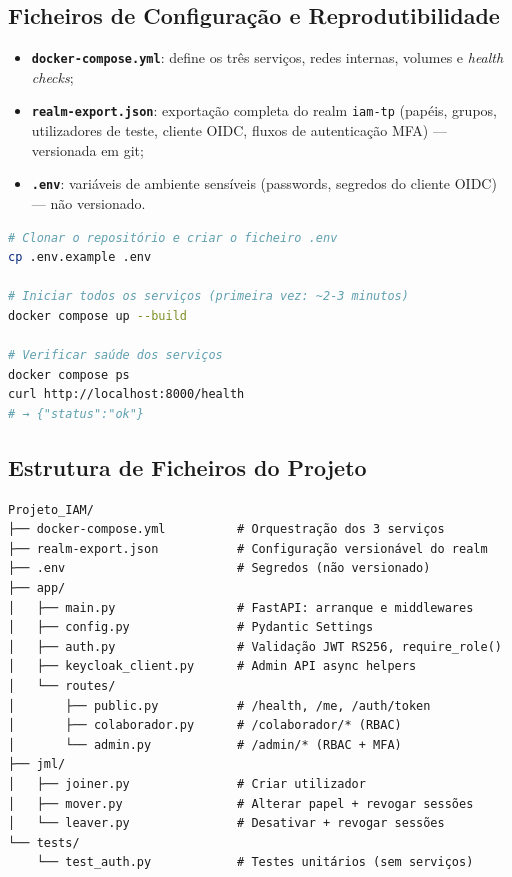 \documentclass[12pt,a4paper]{article}
\begin{document}
\subsection{Ficheiros de Configuração e Reprodutibilidade}

\begin{itemize}[leftmargin=1.5cm]
  \item \textbf{\texttt{docker-compose.yml}}: define os três serviços, redes internas, volumes e \textit{health checks};
  \item \textbf{\texttt{realm-export.json}}: exportação completa do realm \texttt{iam-tp} (papéis, grupos, utilizadores de teste, cliente OIDC, fluxos de autenticação MFA) — versionada em git;
  \item \textbf{\texttt{.env}}: variáveis de ambiente sensíveis (passwords, segredos do cliente OIDC) — não versionado.
\end{itemize}

\begin{lstlisting}[language=bash, caption=Arranque completo da infraestrutura]
# Clonar o repositório e criar o ficheiro .env
cp .env.example .env

# Iniciar todos os serviços (primeira vez: ~2-3 minutos)
docker compose up --build

# Verificar saúde dos serviços
docker compose ps
curl http://localhost:8000/health
# → {"status":"ok"}
\end{lstlisting}

\subsection{Estrutura de Ficheiros do Projeto}

\begin{verbatim}
Projeto_IAM/
├── docker-compose.yml          # Orquestração dos 3 serviços
├── realm-export.json           # Configuração versionável do realm
├── .env                        # Segredos (não versionado)
├── app/
│   ├── main.py                 # FastAPI: arranque e middlewares
│   ├── config.py               # Pydantic Settings
│   ├── auth.py                 # Validação JWT RS256, require_role()
│   ├── keycloak_client.py      # Admin API async helpers
│   └── routes/
│       ├── public.py           # /health, /me, /auth/token
│       ├── colaborador.py      # /colaborador/* (RBAC)
│       └── admin.py            # /admin/* (RBAC + MFA)
├── jml/
│   ├── joiner.py               # Criar utilizador
│   ├── mover.py                # Alterar papel + revogar sessões
│   └── leaver.py               # Desativar + revogar sessões
└── tests/
    └── test_auth.py            # Testes unitários (sem serviços)
\end{verbatim}
\end{document}
